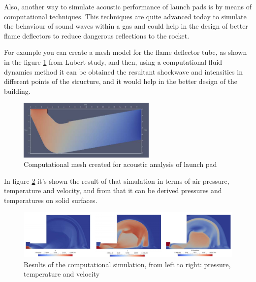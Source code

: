 Also, another way to simulate acoustic performance of launch pads is by means of
computational techniques. This techniques are quite advanced today to simulate the
behaviour of sound waves within a gas and could help in the design of better flame
deflectors to reduce dangerous reflections to the rocket.

For example you can create a mesh model for the flame deflector tube, as shown in
the figure \ref{fig:compu_model} from Lubert study,\cite{2017Lubert} and then,
using a computational fluid dynamics method
it can be obtained the resultant shockwave and intensities in different points of the
structure, and it would help in the better design of the building.

\begin{figure}[h]
	\centering
	\includegraphics[width=0.6\textwidth]{img/compu_model.png}
	\caption{Computational mesh created for acoustic analysis of launch pad}
	\label{fig:compu_model}
\end{figure}

In figure \ref{fig:compu_results} it's shown the result of that simulation in terms of
air pressure, temperature and velocity, and from that it can be derived pressures
and temperatures on solid surfaces.

\begin{figure}[h]
	\centering
	\includegraphics[width=\textwidth]{img/compu_results.png}
	\caption[Results of the computational acoustic simulation]
	{Results of the computational simulation, from left to right: pressure, temperature
	and velocity}
	\label{fig:compu_results}
\end{figure}

